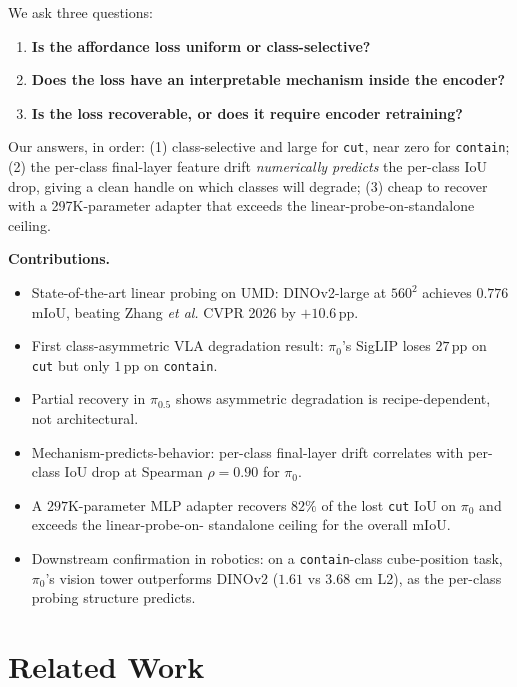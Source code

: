 \documentclass[10pt]{article}
\begin{document}
We ask three questions:
\begin{enumerate}[leftmargin=*]
  \item \textbf{Is the affordance loss uniform or class-selective?}
  \item \textbf{Does the loss have an interpretable mechanism inside the encoder?}
  \item \textbf{Is the loss recoverable, or does it require encoder retraining?}
\end{enumerate}

Our answers, in order: (1) class-selective and large for \texttt{cut}, near
zero for \texttt{contain}; (2) the per-class final-layer feature drift
\emph{numerically predicts} the per-class IoU drop, giving a clean handle on
which classes will degrade; (3) cheap to recover with a 297K-parameter
adapter that exceeds the linear-probe-on-standalone ceiling.

\textbf{Contributions.}
\begin{itemize}[leftmargin=*]
  \item State-of-the-art linear probing on UMD: DINOv2-large at $560^2$
        achieves $0.776$ mIoU, beating Zhang \emph{et al.} CVPR 2026 by
        $+10.6$\,pp.
  \item First class-asymmetric VLA degradation result: $\pi_0$'s SigLIP
        loses $27$\,pp on \texttt{cut} but only $1$\,pp on \texttt{contain}.
  \item Partial recovery in $\pi_{0.5}$ shows asymmetric degradation is
        recipe-dependent, not architectural.
  \item Mechanism-predicts-behavior: per-class final-layer drift correlates
        with per-class IoU drop at Spearman $\rho = 0.90$ for $\pi_0$.
  \item A $297$K-parameter MLP adapter recovers $82\%$ of the lost
        \texttt{cut} IoU on $\pi_0$ and exceeds the linear-probe-on-
        standalone ceiling for the overall mIoU.
  \item Downstream confirmation in robotics: on a \texttt{contain}-class
        cube-position task, $\pi_0$'s vision tower outperforms DINOv2
        ($1.61$ vs $3.68$ cm L2), as the per-class probing structure
        predicts.
\end{itemize}

\section{Related Work}
\end{document}
